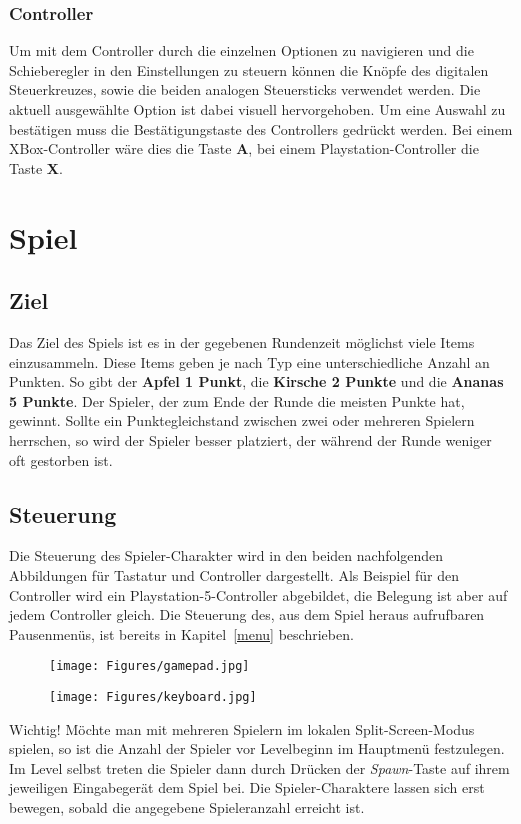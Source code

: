 \subsubsection*{Controller}
Um mit dem Controller durch die einzelnen Optionen zu navigieren und die Schieberegler in den Einstellungen zu steuern können die Knöpfe des digitalen Steuerkreuzes, sowie die beiden analogen Steuersticks verwendet werden. Die aktuell ausgewählte Option ist dabei visuell hervorgehoben. Um eine Auswahl zu bestätigen muss die Bestätigungstaste des Controllers gedrückt werden. Bei einem XBox-Controller wäre dies die Taste \textbf{A}, bei einem Playstation-Controller die Taste \textbf{X}.

\section{Spiel}
\subsection{Ziel}
Das Ziel des Spiels ist es in der gegebenen Rundenzeit möglichst viele Items einzusammeln. Diese Items geben je nach Typ eine unterschiedliche Anzahl an Punkten. So gibt der \textbf{Apfel 1 Punkt}, die \textbf{Kirsche 2 Punkte} und die \textbf{Ananas 5 Punkte}. Der Spieler, der zum Ende der Runde die meisten Punkte hat, gewinnt. Sollte ein Punktegleichstand zwischen zwei oder mehreren Spielern herrschen, so wird der Spieler besser platziert, der während der Runde weniger oft gestorben ist.

\subsection{Steuerung}
Die Steuerung des Spieler-Charakter wird in den beiden nachfolgenden Abbildungen für Tastatur und Controller dargestellt. Als Beispiel für den Controller wird ein Playstation-5-Controller abgebildet, die Belegung ist aber auf jedem Controller gleich. Die Steuerung des, aus dem Spiel heraus aufrufbaren Pausenmenüs, ist bereits in Kapitel~\ref{menu} beschrieben.\\

\begin{figure}[H]
\centering
\texttt{[image: Figures/gamepad.jpg]}
\end{figure}

\begin{figure}[H]
\centering
\texttt{[image: Figures/keyboard.jpg]}
\end{figure}

\begin{bclogo}[logo=\bcattention, noborder=true, barre=none]{Wichtig!}
Möchte man mit mehreren Spielern im lokalen Split-Screen-Modus spielen, so ist die Anzahl der Spieler vor Levelbeginn im Hauptmenü festzulegen. Im Level selbst treten die Spieler dann durch Drücken der \textit{Spawn}-Taste auf ihrem jeweiligen Eingabegerät dem Spiel bei. Die Spieler-Charaktere lassen sich erst bewegen, sobald die angegebene Spieleranzahl erreicht ist.
\end{bclogo}